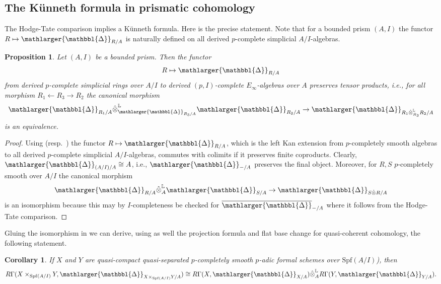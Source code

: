 \documentclass{amsart}
\newcommand{\prism}{{\mathlarger{\mathbbl{\Delta}}}}
\theoremstyle{plain}
\newtheorem{proposition}[theorem]{Proposition}
\newtheorem{corollary}[theorem]{Corollary}
\theoremstyle{definition}
\newcommand{\Spf}{\mathrm{Spf}}
\newcommand{\red}[1]{{\color{black} #1}}
\begin{document}
\subsection{The K\"unneth formula in prismatic cohomology}
\label{sec:kunn-form-prism}

The Hodge-Tate comparison implies a K\"unneth formula. Here is the precise statement.
Note that for a bounded prism $(A,I)$ the functor $R\mapsto \prism_{R/A}$ is naturally defined on all derived $p$-complete simplicial $A/I$-algebras.

\begin{proposition}
  \label{sec:kunn-form-prism-proposition-kunneth-formula}
  Let $(A,I)$ be a bounded prism. Then the functor
  $$
  R\mapsto \prism_{R/A}
  $$
  from derived $p$-complete simplicial rings over $A/I$ to derived $(p,I)$-complete $E_\infty$-algebras over $A$ preserves tensor products, i.e., for all morphism $R_1\leftarrow R_3 \to R_2$ the canonical morphism
  $$
  \prism_{R_1/A}\hat{\otimes}^{\mathbb{L}}_{\prism_{R_3/A}} \prism_{R_2/A}\to \prism_{R_1\hat{\otimes}^{\mathbb{L}}_{R_3}R_2/A}
  $$
  is an equivalence. 
\end{proposition}
\begin{proof}
  Using \cite[Construction 2.1]{bhatt_morrow_scholze_topological_hochschild_homology} (resp.\ \cite[Proposition 5.5.8.15]{lurie_higher_topos_theory}) the functor $R\mapsto \prism_{R/A}$, which is the left Kan extension from $p$-completely smooth algebras to all derived $p$-complete simplicial $A/I$-algebras, commutes with colimits if it preserves finite coproducts. Clearly, $\prism_{(A/I)/A}\cong A$, i.e., $\prism_{-/A}$ preserves the final object. Moreover, for $R,S$ $p$-completely smooth over $A/I$ the canonical morphism
  $$
  \prism_{R/A}\hat{\otimes}^{\mathbb{L}}_{A} \prism_{S/A}\to \prism_{S\hat{\otimes} R/A} 
  $$
  is an isomorphism because this may by $I$-completeness be checked for $\overline{\prism}_{-/A}$ where it follows from the Hodge-Tate comparison.
\end{proof}

Gluing the isomorphism in  we can derive, using as well the projection formula and flat base change for quasi-coherent cohomology, the following statement.
\begin{corollary}
  \label{sec:kunn-form-prism-smooth-proper-case}
  If $X$ and $Y$ are \red{quasi-compact quasi-separated} $p$-completely smooth $p$-adic formal schemes over $\Spf(A/I)$), then
$$
R\Gamma(X\times_{\Spf(A/I)} Y,\prism_{X\times_{\Spf(A/I)} Y/A})\cong R\Gamma(X,\prism_{X/A})\hat{\otimes}_A^{\mathbb{L}}R\Gamma(Y,\prism_{Y/A}).
$$
\end{corollary}
\end{document}
